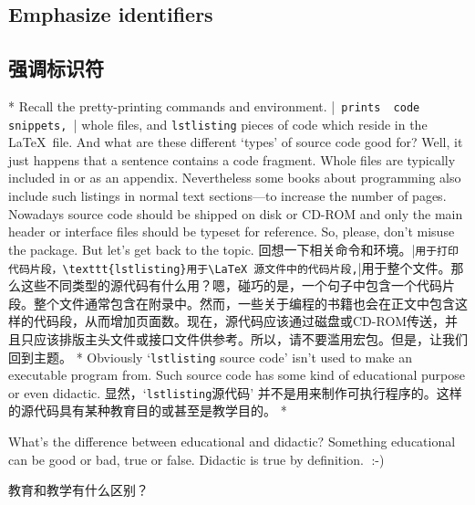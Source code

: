 \begin{paracol}{2}
\subsection{Emphasize identifiers}\label{uEmphasizeIdentifiers}
\switchcolumn
\subsection{强调标识符}
\switchcolumn[0]*%
 Recall the pretty-printing commands and environment. |\lstinline| prints
 code snippets, || whole files, and \texttt{lstlisting}
 pieces of code which reside in the \LaTeX\ file. And what are these
 different `types' of source code good for? Well, it just happens that a
 sentence contains a code fragment. Whole files are typically included in or
 as an appendix. Nevertheless some books about programming also include such
 listings in normal text sections---to increase the number of pages.
 Nowadays source code should be shipped on disk or CD-ROM and only the main
 header or interface files should be typeset for reference. So, please, don't
 misuse the  package. But let's get back to the topic.
 \switchcolumn
 回想一下相关命令和环境。|\lstinline|用于打印代码片段，\texttt{lstlisting}用于\LaTeX 源文件中的代码片段,||用于整个文件。那么这些不同类型的源代码有什么用？嗯，碰巧的是，一个句子中包含一个代码片段。整个文件通常包含在附录中。然而，一些关于编程的书籍也会在正文中包含这样的代码段，从而增加页面数。现在，源代码应该通过磁盘或CD-ROM传送，并且只应该排版主头文件或接口文件供参考。所以，请不要滥用宏包。但是，让我们回到主题。
 \switchcolumn[0]*%
 Obviously `\texttt{lstlisting} source code' isn't used to make an executable
 program from. Such source code has some kind of educational purpose or even
 didactic.
 \switchcolumn
显然，`\texttt{lstlisting}源代码' 并不是用来制作可执行程序的。这样的源代码具有某种教育目的或甚至是教学目的。
\switchcolumn[0]*%
 \begin{advise}
 \item What's the difference between educational and didactic?
       \advisespace
       Something educational can be good or bad, true or false.
       Didactic is true by definition.^^A :-)
 \end{advise}
 \switchcolumn
 \begin{advise}
\item 教育和教学有什么区别？
\advisespace

\end{advise}
\end{paracol}
